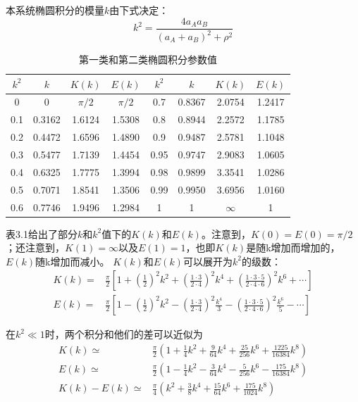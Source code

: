 本系统椭圆积分的模量$k$由下式决定：
\begin{equation}
  k^2=\frac{4a_A a_B}{(a_A+a_B)^2+\rho^2}
\end{equation}



\begin{table}
\centering
\caption{第一类和第二类椭圆积分参数值}
\label{my-label}
\begin{tabular}{|c|c|c|c|c|c|c|c|}
\hline
$k^2$    & $k$  & $K(k)$ &$E(k)$  &$k^2$  & $k$ &$K(k)$  &$E(k)$  \\ \hline
0   & 0 &$\pi/2$  & $\pi/2$ &0.7&0.8367  &2.0754  & 1.2417 \\ \hline
0.1 & 0.3162  & 1.6124 &1.5308  &0.8& 0.8944 & 2.2572 & 1.1785 \\ \hline
0.2 & 0.4472  & 1.6596 &1.4890  &0.9&0.9487  & 2.5781 & 1.1048 \\ \hline
0.3 & 0.5477  & 1.7139 & 1.4454 &0.95&0.9747  &2.9083  & 1.0605 \\ \hline
0.4 & 0.6325  & 1.7775 &1.3994  &0.98& 0.9899 & 3.3541 & 1.0286 \\ \hline
0.5 & 0.7071  & 1.8541 &1.3506  & 0.99& 0.9950 &3.6956  & 1.0160 \\ \hline
0.6 & 0.7746  & 1.9496 &1.2984  &1  &1  &$\infty$  &  1\\ \hline
\end{tabular}
\end{table}

表3.1给出了部分$k$和$k^2$值下的$K(k)$和$E(k)$。注意到，$K(0)=E(0)=\pi/2$；还注意到，$K(1)=\infty$以及$E(1)=1$，也即$K(k)$是随k增加而增加的，$E(k)$随k增加而减小。
$K(k)$和$E(k)$可以展开为$k^2$的级数：
\begin{subequations}
	\begin{align}
  K(k) =& \frac{\pi}{2}[1+(\frac{1}{2})^2 k^2+(\frac{1\cdot 3}{2\cdot 4})^2 k^4+(\frac{1\cdot 3\cdot 5}{2\cdot 4\cdot 6})^2 k^6+\cdots] \\
  E(k) =& \frac{\pi}{2}[1-(\frac{1}{2})^2 k^2-(\frac{1\cdot 3}{2\cdot 4})^2 \frac{k^4}{3}-(\frac{1\cdot 3\cdot 5}{2\cdot 4\cdot 6})^2 \frac{k^6}{5}-\cdots]
 	\end{align}
  \end{subequations}

在$k^2\ll 1$时，两个积分和他们的差可以近似为
\begin{subequations}
	\begin{align}
  K(k) \simeq&  \frac{\pi}{2}(1+\frac{1}{4}k^2+\frac{9}{64}k^4+\frac{25}{256}k^6+\frac{1225}{16384}k^8)\\
  E(k) \simeq&  \frac{\pi}{2}(1-\frac{1}{4}k^2-\frac{3}{64}k^4-\frac{5}{256}k^6-\frac{175}{16384}k^8)\\ 
  K(k)-E(k) \simeq& \frac{\pi}{4}(k^2+\frac{3}{8}k^4+\frac{15}{64}k^6+\frac{175}{1024}k^8) 
  	\end{align}
\end{subequations}

